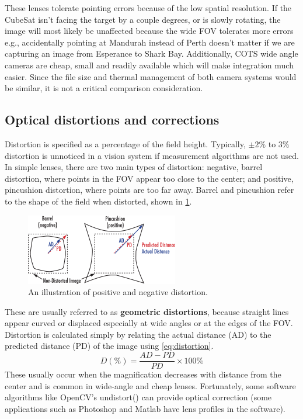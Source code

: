 \documentclass[10pt]{article}
\begin{document}
\begin{multicols}{2}
These lenses tolerate pointing errors because of the low spatial resolution. If the CubeSat isn't facing the target by a couple degrees, or is slowly rotating, the image will most likely be unaffected because the wide FOV tolerates more errors e.g., accidentally pointing at Mandurah instead of Perth doesn't matter if we are capturing an image from Esperance to Shark Bay.
Additionally, COTS wide angle cameras are cheap, small and readily available which will make integration much easier.
\newline \newline
Since the file size and thermal management of both camera systems would be similar, it is not a critical comparison consideration.

\subsection{Optical distortions and corrections}
Distortion is specified as a percentage of the field height. Typically, $\pm 2\%$ to $3\%$ distortion is unnoticed in a vision system if measurement algorithms are not used. In simple lenses, there are two main types of distortion: negative, barrel distortion, where points in the FOV appear too close to the center; and positive, pincushion distortion, where points are too far away. Barrel and pincushion refer to the shape of the field when distorted, shown in \ref{fig:lens-distortion}.
\begin{figure}[H]
    \centering
    \includegraphics[width=0.6\linewidth]{Images/Week 1/distortion-2.png}
    \caption{An illustration of positive and negative distortion.}
    \label{fig:lens-distortion}
\end{figure}
These are usually referred to as \textbf{geometric distortions}, because straight lines appear curved or displaced especially at wide angles or at the edges of the FOV.
Distortion is calculated simply by relating the actual distance (AD) to the predicted distance (PD) of the image using \ref{eq:distortion}.
\begin{equation}
D(\%)=\frac{AD-PD}{PD}\times100\%
    \label{eq:distortion}
\end{equation}
These usually occur when the magnification decreases with distance from the center and is common in wide-angle and cheap lenses. Fortunately, some software algorithms like OpenCV's undistort() can provide optical correction (some applications such as Photoshop and Matlab have lens profiles in the software).
\newline \newline

\end{multicols}
\end{document}
